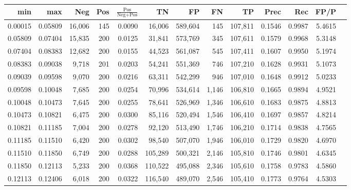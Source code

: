 \begin{tabular}{rrrrrrrrrrrrr}
\toprule
    min &     max &    Neg & Pos & $\frac{\text{Pos}}{\text{Neg}+\text{Pos}}$ &      TN &      FP &      FN &      TP &   Prec &    Rec &   FP/P \\
\midrule
0.00015 & 0.05809 & 16,006 & 145 &                                     0.0090 &  16,006 & 589,604 &     145 & 107,811 & 0.1546 & 0.9987 & 5.4615 \\
0.05809 & 0.07404 & 15,835 & 200 &                                     0.0125 &  31,841 & 573,769 &     345 & 107,611 & 0.1579 & 0.9968 & 5.3148 \\
0.07404 & 0.08383 & 12,682 & 200 &                                     0.0155 &  44,523 & 561,087 &     545 & 107,411 & 0.1607 & 0.9950 & 5.1974 \\
0.08383 & 0.09038 &  9,718 & 201 &                                     0.0203 &  54,241 & 551,369 &     746 & 107,210 & 0.1628 & 0.9931 & 5.1073 \\
0.09039 & 0.09598 &  9,070 & 200 &                                     0.0216 &  63,311 & 542,299 &     946 & 107,010 & 0.1648 & 0.9912 & 5.0233 \\
0.09598 & 0.10048 &  7,685 & 200 &                                     0.0254 &  70,996 & 534,614 &   1,146 & 106,810 & 0.1665 & 0.9894 & 4.9521 \\
0.10048 & 0.10473 &  7,645 & 200 &                                     0.0255 &  78,641 & 526,969 &   1,346 & 106,610 & 0.1683 & 0.9875 & 4.8813 \\
0.10473 & 0.10821 &  6,475 & 200 &                                     0.0300 &  85,116 & 520,494 &   1,546 & 106,410 & 0.1697 & 0.9857 & 4.8214 \\
0.10821 & 0.11185 &  7,004 & 200 &                                     0.0278 &  92,120 & 513,490 &   1,746 & 106,210 & 0.1714 & 0.9838 & 4.7565 \\
0.11185 & 0.11510 &  6,420 & 200 &                                     0.0302 &  98,540 & 507,070 &   1,946 & 106,010 & 0.1729 & 0.9820 & 4.6970 \\
0.11510 & 0.11850 &  6,749 & 200 &                                     0.0288 & 105,289 & 500,321 &   2,146 & 105,810 & 0.1746 & 0.9801 & 4.6345 \\
0.11850 & 0.12113 &  5,233 & 200 &                                     0.0368 & 110,522 & 495,088 &   2,346 & 105,610 & 0.1758 & 0.9783 & 4.5860 \\
0.12113 & 0.12406 &  6,018 & 200 &                                     0.0322 & 116,540 & 489,070 &   2,546 & 105,410 & 0.1773 & 0.9764 & 4.5303 \\

\end{tabular}
